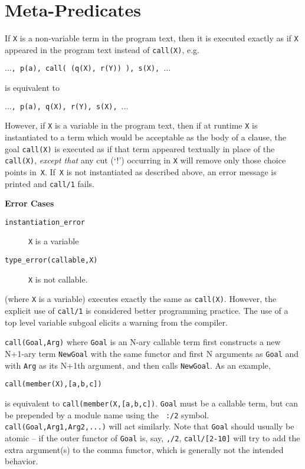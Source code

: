 \section{Meta-Predicates} \label{meta_predicates}
\begin{description}
%
    If {\tt X} is a non-variable term in the program text, then it is 
    executed exactly as if {\tt X} appeared in the program text instead 
    of {\tt call(X)},
    e.g.
    \begin{center}
        {\tt $\ldots$, p(a), call( (q(X), r(Y)) ), s(X), $\ldots$}
    \end{center}
    is equivalent to
    \begin{center}
        {\tt $\ldots$, p(a), q(X), r(Y), s(X), $\ldots$}
    \end{center}
    However, if {\tt X} is a variable in the program text,
    then if at runtime {\tt X} is instantiated to a term which 
    would be acceptable as the body of a clause, the goal 
    {\tt call(X)} is executed as if that
    term appeared textually in place of the {\tt call(X)},
    {\em except that} any cut (`!')
    occurring in {\tt X} will remove only those choice points in~{\tt X}.
    If~{\tt X} is not instantiated as described above,
    an error message is printed and {\tt call/1} fails.

{\bf Error Cases}
    \begin{description}
    \item[{\tt instantiation\_error}]
	{\tt X} is a variable
     \item[{\tt type\_error(callable,X)}]
	{\tt X} is not callable.
    \end{description}

    (where {\tt X} is a variable) executes exactly the same as 
    {\tt call(X)}.
    However, the explicit use of {\tt call/1} is considered better
    programming practice.  The use of a top level variable subgoal
    elicits a warning from the compiler.

%
{\tt call(Goal,Arg)} where {\tt Goal} is an N-ary callable term first
constructs a new N+1-ary term {\tt NewGoal} with the same functor and
first N arguments as {\tt Goal} and with {\tt Arg} as its N+1th
argument, and then calls {\tt NewGoal}.  As an example,

{\tt call(member(X),[a,b,c])}

is equivalent to {\tt call(member(X,[a,b,c])}.  {\tt Goal} must be a
callable term, but can be prepended by a module name using the {\tt
  :/2} symbol.  {\tt call(Goal,Arg1,Arg2,...)} will act similarly. 
Note that {\tt Goal} should usually be atomic -- if the outer functor 
of {\tt Goal} is, say, {\tt ,/2}, {\tt call/[2-10]} will try to add 
the extra argument(s) to the comma functor, which is generally not 
the intended behavior.


\end{description}
